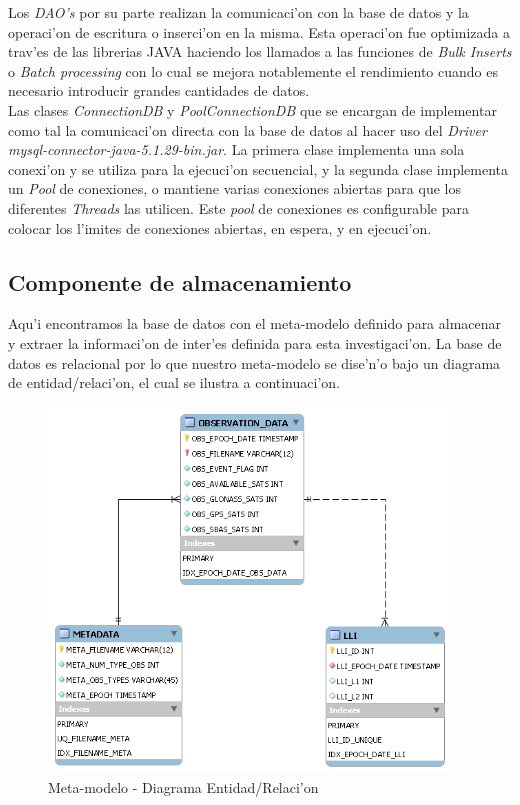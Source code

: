 \begin{enumerate}
Los \emph{DAO's} por su parte realizan la comunicaci'on con la base de datos y la operaci'on de escritura o inserci'on en la misma. Esta operaci'on fue optimizada a trav'es de las librerias JAVA haciendo los llamados a las funciones de \emph{Bulk Inserts} o \emph{Batch processing} con lo cual se mejora notablemente el rendimiento cuando es necesario introducir grandes cantidades de datos.\\

Las clases \emph{ConnectionDB} y \emph{PoolConnectionDB} que se encargan de implementar como tal la comunicaci'on directa con la base de datos al hacer uso del \emph{Driver mysql-connector-java-5.1.29-bin.jar}. La primera clase implementa una sola conexi'on y se utiliza para la ejecuci'on secuencial, y la  segunda clase implementa un \emph{Pool} de conexiones, o mantiene varias conexiones abiertas para que los diferentes \emph{Threads} las utilicen. Este \emph{pool} de conexiones es configurable para colocar los l'imites de conexiones abiertas, en espera, y en ejecuci'on.

\end{enumerate}

\subsection{Componente de almacenamiento}
\noindent
Aqu'i encontramos la base de datos con el meta-modelo definido para almacenar y extraer la informaci'on de inter'es definida para esta investigaci'on. La base de datos es relacional por lo que nuestro meta-modelo se dise'n'o bajo un diagrama de entidad/relaci'on, el cual se ilustra a continuaci'on.

\begin{figure}[H]
\centering
\includegraphics[width=0.95\textwidth]{images/ER}
\caption{Meta-modelo - Diagrama Entidad/Relaci'on}
\label{fig:4.10}
\end{figure}

